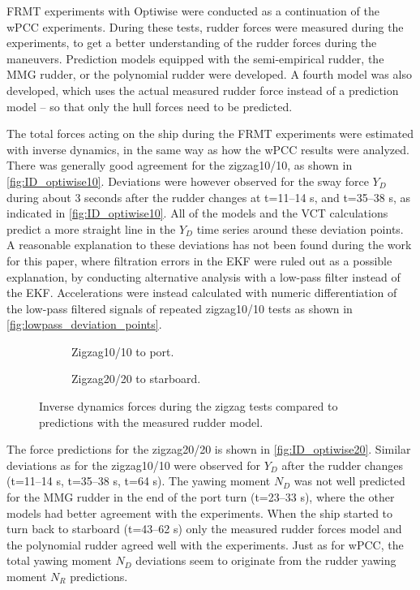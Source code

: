 FRMT experiments with Optiwise were conducted as a continuation of the wPCC experiments. During these tests, rudder forces were measured during the experiments, to get a better understanding of the rudder forces during the maneuvers. Prediction models equipped with the semi-empirical rudder, the MMG rudder, or the polynomial rudder were developed. A fourth model was also developed, which uses the actual measured rudder force instead of a prediction model -- so that only the hull forces need to be predicted. 

The total forces acting on the ship during the FRMT experiments were estimated with inverse dynamics, in the same way as how the wPCC results were analyzed. There was generally good agreement for the zigzag10/10, as shown in \autoref{fig:ID_optiwise10}. Deviations were however observed for the sway force $Y_D$ during about 3 seconds after the rudder changes at t=11--14 s, and t=35--38 s, as indicated in \autoref{fig:ID_optiwise10}. All of the models and the VCT calculations predict a more straight line in the $Y_D$ time series around these deviation points. 
A reasonable explanation to these deviations has not been found during the work for this paper, where filtration errors in the EKF were ruled out as a possible explanation, by conducting alternative analysis with a low-pass filter instead of the EKF. Accelerations were instead calculated with numeric differentiation of the low-pass filtered signals of repeated zigzag10/10 tests as shown in \autoref{fig:lowpass_deviation_points}.
\begin{figure}[h]
    \centering
    \begin{subfigure}[b]{\textwidth}
        \centering
        
        \caption{Zigzag10/10 to port.}
        \label{fig:ID_measured_rudder_zigzag_10_10}
    \end{subfigure}
     \vfill
    \begin{subfigure}[b]{\textwidth}
        \centering
        
        \caption{Zigzag20/20 to starboard.}
        \label{fig:ID_measured_rudder_zigzag_20_20}
    \end{subfigure}
    \caption{Inverse dynamics forces during the zigzag tests compared to predictions with the measured rudder model.}
    \label{fig:ID_optiwise20}
\end{figure}
The force predictions for the zigzag20/20 is shown in \autoref{fig:ID_optiwise20}. Similar deviations as for the zigzag10/10 were observed for $Y_D$ after the rudder changes (t=11--14 s, t=35--38 s, t=64 s). The yawing moment $N_D$ was not well predicted for the MMG rudder in the end of the port turn (t=23--33 s), where the other models had better agreement with the experiments. When the ship started to turn back to starboard (t=43--62 s) only the measured rudder forces model and the polynomial rudder agreed well with the experiments. Just as for wPCC, the total yawing moment $N_D$ deviations seem to originate from the rudder yawing moment $N_R$ predictions.
